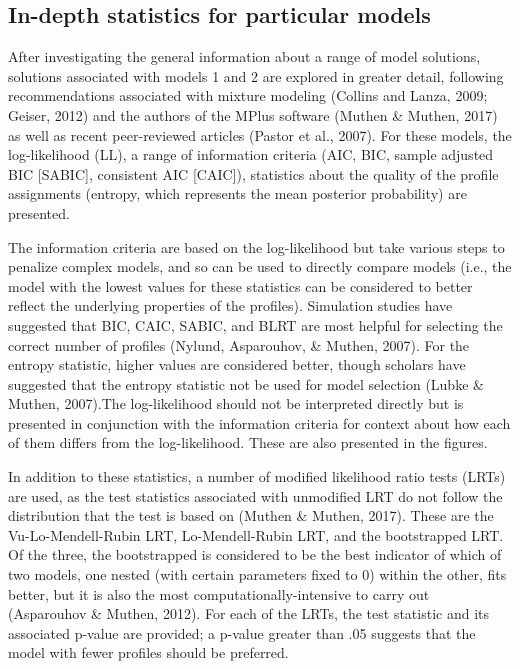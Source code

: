 \documentclass[]{msu-thesis}
\theoremstyle{definition}
\theoremstyle{definition}
\theoremstyle{definition}
\theoremstyle{remark}
\begin{document}
\subsection{In-depth statistics for particular
models}\label{in-depth-statistics-for-particular-models}

After investigating the general information about a range of model
solutions, solutions associated with models 1 and 2 are explored in
greater detail, following recommendations associated with mixture
modeling (Collins and Lanza, 2009; Geiser, 2012) and the authors of the
MPlus software (Muthen \& Muthen, 2017) as well as recent peer-reviewed
articles (Pastor et al., 2007). For these models, the log-likelihood
(LL), a range of information criteria (AIC, BIC, sample adjusted BIC
{[}SABIC{]}, consistent AIC {[}CAIC{]}), statistics about the quality of
the profile assignments (entropy, which represents the mean posterior
probability) are presented.

The information criteria are based on the log-likelihood but take
various steps to penalize complex models, and so can be used to directly
compare models (i.e., the model with the lowest values for these
statistics can be considered to better reflect the underlying properties
of the profiles). Simulation studies have suggested that BIC, CAIC,
SABIC, and BLRT are most helpful for selecting the correct number of
profiles (Nylund, Asparouhov, \& Muthen, 2007). For the entropy
statistic, higher values are considered better, though scholars have
suggested that the entropy statistic not be used for model selection
(Lubke \& Muthen, 2007).The log-likelihood should not be interpreted
directly but is presented in conjunction with the information criteria
for context about how each of them differs from the log-likelihood.
These are also presented in the figures.

In addition to these statistics, a number of modified likelihood ratio
tests (LRTs) are used, as the test statistics associated with unmodified
LRT do not follow the distribution that the test is based on (Muthen \&
Muthen, 2017). These are the Vu-Lo-Mendell-Rubin LRT, Lo-Mendell-Rubin
LRT, and the bootstrapped LRT. Of the three, the bootstrapped is
considered to be the best indicator of which of two models, one nested
(with certain parameters fixed to 0) within the other, fits better, but
it is also the most computationally-intensive to carry out (Asparouhov
\& Muthen, 2012). For each of the LRTs, the test statistic and its
associated p-value are provided; a p-value greater than .05 suggests
that the model with fewer profiles should be preferred.
\end{document}
